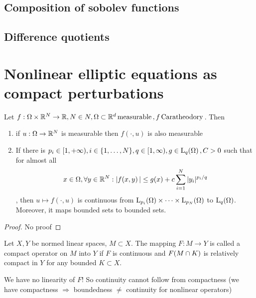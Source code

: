 \documentclass{article}
\begin{document}
\subsection{Composition of sobolev functions}
\label{sec:composition}

\subsection{Difference quotients}
\label{sec:difference_quotients}

\section{Nonlinear elliptic equations as compact perturbations}
\label{sec:nonlinear_elliptic_compact}

\begin{theorem}[Nemytskii]
	Let $f: \Omega \times {\mathbb R}^N \to {\mathbb R}, N \in N, \Omega \subset {\mathbb R}^d \, \text{measurable} \,, f \, \text{Caratheodory} \,$. Then
	\begin{enumerate}
		\item if $u: \Omega \to {\mathbb R}^N$ is measurable then $f(\cdot, u)$ is also measurable
		\item If there is $p_i \in [1, +\infty), i \in \{1,\dots,N\}, q \in [1, \infty), g \in \LpSet[q]{\Omega}, C>0$ such that for almost all
			\[
				x \in \Omega, \forall y \in {\mathbb R}^N: |f\qty(x,y)| \leq g(x) + c \sum_{i=1}^N |y_i|^{p_i/q}
			\]
			, then $u \mapsto f(\cdot, u)$ is continuous from $\LpSet[p_i]{\Omega} \times \dots \times \LpSet[p_N]{\Omega}$ to $\LpSet[q]{\Omega}$. Moreover, it maps bounded sets to bounded sets.
	\end{enumerate}
\end{theorem}
\begin{proof}
	No proof
\end{proof}

\begin{definition}
	Let $X,Y$ be normed linear spaces, $M \subset X.$ The mapping $F:M \to Y$ is called a compact operator on $M$ into $Y$ if $F$ is continuous and $F\qty(M \cap K)$ is relatively compact in $Y$ for any bounded $K \subset X.$
\end{definition}

\begin{remark}
	We have no linearity of $F$! So continuity cannot follow from compactness (we have compactness $\Rightarrow $ boundedness $\neq$ continuity for nonlinear operators)
\end{remark}
\end{document}
